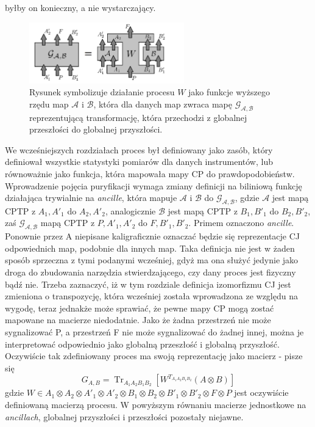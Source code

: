 \documentclass[10pt]{article} %
\DeclareMathOperator{\Trs}{Tr}
\begin{document}
byłby on konieczny, a nie wystarczający. 
\begin{figure}[t]
\centering
\includegraphics[width=0.6\textwidth]{obrazki/done1}
\caption{
Rysunek symbolizuje działanie procesu $W$ jako funkcje wyższego rzędu map $\mathcal{A}$ i $\mathcal{B}$, która dla danych map zwraca mapę 
$\mathcal{G_{A,B}}$ reprezentującą transformację, która przechodzi z globalnej przeszłości do globalnej przyszłości.
}
\label{higherordermap}
\end{figure}
We wcześniejszych rozdziałach proces był definiowany jako zasób, który definiował wszystkie statystyki pomiarów dla danych instrumentów, lub równoważnie jako funkcja, która mapowała mapy CP do prawdopodobieństw. Wprowadzenie pojęcia puryfikacji wymaga zmiany definicji na biliniową funkcję działająca trywialnie na \textit{ancille}, która mapuje
$\mathcal{A}$ i $\mathcal{B}$ do $\mathcal{G_{A,B}}$, gdzie $\mathcal{A}$ jest mapą CPTP z $A_1, A'_1$ do $A_2, A'_2$, analogicznie $\mathcal{B}$ jest mapą CPTP z
$B_1, B'_1$ do $B_2, B'_2$, zaś $\mathcal{G_{A,B}}$ mapą CPTP z $P, A'_1, A'_2$ do $F, B'_1, B'_2$. Primem oznaczono \textit{ancille}. Ponownie przez A niepisane kaligraficznie oznaczać będzie się reprezentacje CJ odpowiednich map, podobnie dla innych map. Taka definicja nie jest w żaden sposób sprzeczna z tymi podanymi wcześniej, gdyż ma ona służyć jedynie jako droga do zbudowania narzędzia stwierdzającego, czy dany proces jest fizyczny bądź nie. Trzeba zaznaczyć, iż w tym rozdziale definicja izomorfizmu CJ jest zmieniona o transpozycję, która wcześniej została wprowadzona ze względu na wygodę, teraz jednakże może sprawiać, że pewne mapy CP 
mogą zostać mapowane na macierze niedodatnie. Jako że żadna przestrzeń nie może sygnalizować P, a przestrzeń F nie może sygnalizować do żadnej innej,
można je interpretować odpowiednio jako globalną przeszłość i globalną przyszłość. Oczywiście tak zdefiniowany proces ma swoją reprezentację jako macierz - pisze się
\begin{equation}
\label{eq:longnp}
G_{A,B} = \Trs_{A_1A_2B_1B_2} \left[ W^{T_{A_1A_2B_1B_2}} (A\otimes B)\right]
\end{equation}
gdzie $W \in A_1 \otimes A_2 \otimes A'_1 \otimes A'_2 \otimes B_1 \otimes B_2 \otimes B'_1 \otimes B'_2 \otimes F \otimes P$ jest oczywiście definiowaną macierzą procesu. W powyższym równaniu macierze jednostkowe na \textit{ancillach}, globalnej przyszłości i przeszłości pozostały niejawne.
\end{document}
